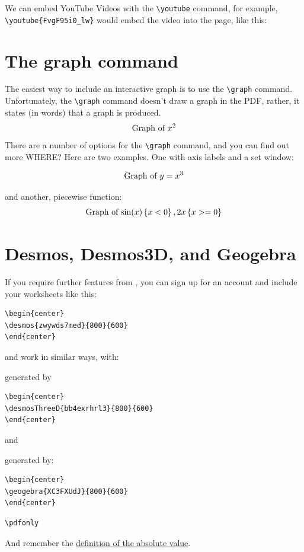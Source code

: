\documentclass{ximera}
\begin{document}
We can embed YouTube Videos with the \verb|\youtube| command, for example,
\verb|\youtube{FvgF95i0_lw}| would embed the video into the page, like
this:
\begin{center}
\end{center}

\section{The graph command}

The easiest way to include an interactive graph is to use the
\verb|\graph| command. Unfortunately, the \verb|\graph| command
doesn't draw a graph in the PDF, rather, it states (in words) that a
graph is produced.
\[
  \graph{x^2}
\]
There are a number of options for the \verb|\graph| command, and you can find
out more WHERE?
Here are two examples. One with axis labels and a set window:

\[
  \graph[xAxisLabel="time", yAxisLabel="distance",xmin=0, xmax=10, ymin=0,
    ymax=10]{y=x^3}
\]

and another, piecewise function:
\[
  \graph{ \sin(x)\left\{x<0\right\}, 2x\left\{ x>=0 \right\} }
\]


\section{Desmos, Desmos3D, and Geogebra}

If you require further features from
, you can sign up for an account
and include your worksheets like this:

\begin{verbatim}
\begin{center}
\desmos{zwywds7med}{800}{600}
\end{center}
\end{verbatim}
\begin{center}
\end{center}

 and
 work in similar ways,
with:
\begin{center}
\end{center}
generated by
\begin{verbatim}
\begin{center}
\desmosThreeD{bb4exrhrl3}{800}{600}
\end{center}
\end{verbatim}
and
\begin{center}
\end{center}
generated by:
\begin{verbatim}
\begin{center}
\geogebra{XC3FXUdJ}{800}{600}
\end{center}
\end{verbatim}
\begin{verbatim}
\pdfonly
\end{verbatim}

And remember the \hyperref[def:absolute_value]{definition of the absolute value}.
\end{document}
